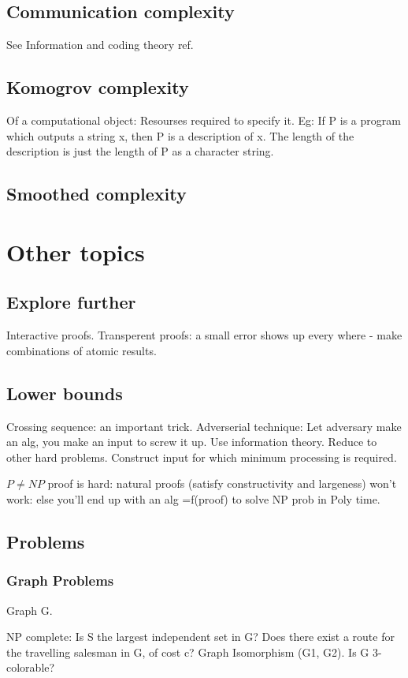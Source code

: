 \documentclass[oneside, article]{memoir}
\begin{document}
\section{Communication complexity}
See Information and coding theory ref.

\section{Komogrov complexity}
Of a computational object: Resourses required to specify it. Eg: If P is a program which outputs a string x, then P is a description of x. The length of the description is just the length of P as a character string.

\section{Smoothed complexity}
\tbc

\chapter{Other topics}
\section{Explore further}
Interactive proofs. Transperent proofs: a small error shows up every where - make combinations of atomic results.

\section{Lower bounds}
Crossing sequence: an important trick. \tbc Adverserial technique: Let adversary make an alg, you make an input to screw it up. \tbc Use information theory. Reduce to other hard problems. Construct input for which minimum processing is required.

$P \neq NP$ proof is hard: natural proofs (satisfy constructivity and largeness) won't work: else you'll end up with an alg =f(proof) to solve NP prob in Poly time. \why

\section{Problems}
\subsection{Graph Problems}
Graph G.

NP complete: Is S the largest independent set in G? Does there exist a route for the travelling salesman in G, of cost c? Graph Isomorphism (G1, G2). Is G 3-colorable?
\end{document}
